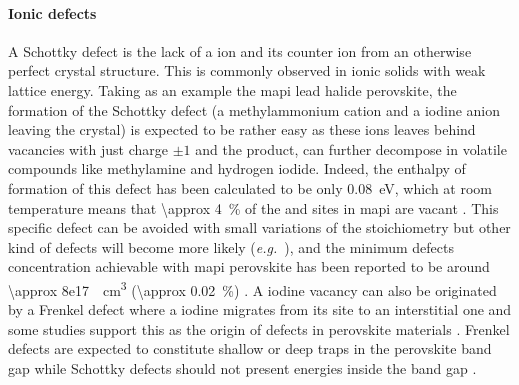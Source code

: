\paragraph{Ionic defects}
	A Schottky defect is the lack of a ion and its counter ion from an otherwise perfect crystal structure.
	This is commonly observed in ionic solids with weak lattice energy.
	Taking as an example the \gls{mapi} lead halide perovskite, the formation of the Schottky defect  (a methylammonium cation and a iodine anion leaving the crystal) is expected to be rather easy as these ions leaves behind vacancies with just charge $\pm 1$ and the product,  can further decompose in volatile compounds like methylamine and hydrogen iodide.
	Indeed, the enthalpy of formation of this defect has been calculated to be only \SI{0.08}{\eV}, which at room temperature means that \SI{\approx 4}{\%} of the  and  sites in \gls{mapi} are vacant \cite{Walsh2015,Yin2014}.
	This specific defect can be avoided with small variations of the stoichiometry but other kind of defects will become more likely (\textsl{e.g.}\ ), and the minimum defects concentration achievable with \gls{mapi} perovskite has been reported to be around \SI{\approx 8e17}{\per\cubic\cm} (\SI{\approx 0.02}{\%}) \cite{Walsh2015}.
	A iodine vacancy can also be originated by a Frenkel defect where a iodine migrates from its site to an interstitial one  and some studies support this as the origin of defects in perovskite materials \cite{Birkhold2018,Birkhold2018a,Minns2017,Mosconi2016,Uratani2017}.
	Frenkel defects are expected to constitute shallow or deep traps in the perovskite band gap while Schottky defects should not present energies inside the band gap \cite{Kim2014h,Yin2014,Buin2014,Du2015}.

